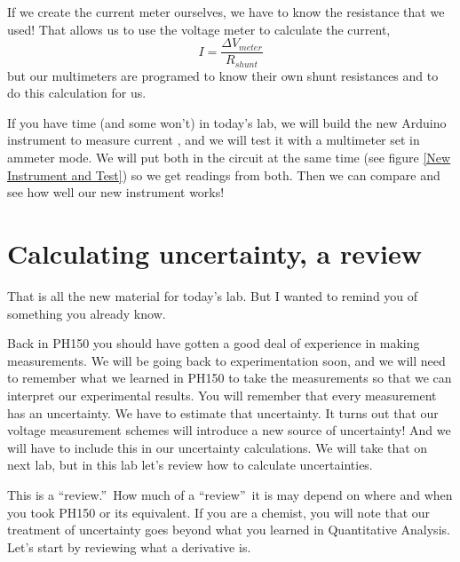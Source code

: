 If we create the current meter ourselves, we have to know the resistance
that we used! That allows us to use the voltage meter to calculate the
current,%
\begin{equation*}
I=\frac{\Delta V_{meter}}{R_{shunt}}
\end{equation*}%
but our multimeters are programed to know their own shunt resistances and to
do this calculation for us.

If you have time (and some won't) in today's lab, we will build the new
Arduino instrument to measure current , and we will test it with a
multimeter set in ammeter mode. We will put both in the circuit at the same
time (see figure \ref{New Instrument and Test}) so we get readings from
both. Then we can compare and see how well our new instrument works!

\section{Calculating uncertainty, a review}

That is all the new material for today's lab. But I wanted to remind you of
something you already know.

Back in PH150 you should have gotten a good deal of experience in making
measurements. We will be going back to experimentation soon, and we will
need to remember what we learned in PH150 to take the measurements so that
we can interpret our experimental results. You will remember that every
measurement has an uncertainty. We have to estimate that uncertainty. It
turns out that our voltage measurement schemes will introduce a new source
of uncertainty! And we will have to include this in our uncertainty
calculations. We will take that on next lab, but in this lab let's review
how to calculate uncertainties.

This is a \textquotedblleft review.\textquotedblright\ How much of a
\textquotedblleft review\textquotedblright\ it is may depend on where and
when you took PH150 or its equivalent. If you are a chemist, you will note
that our treatment of uncertainty goes beyond what you learned in
Quantitative Analysis. Let's start by reviewing what a derivative is.

